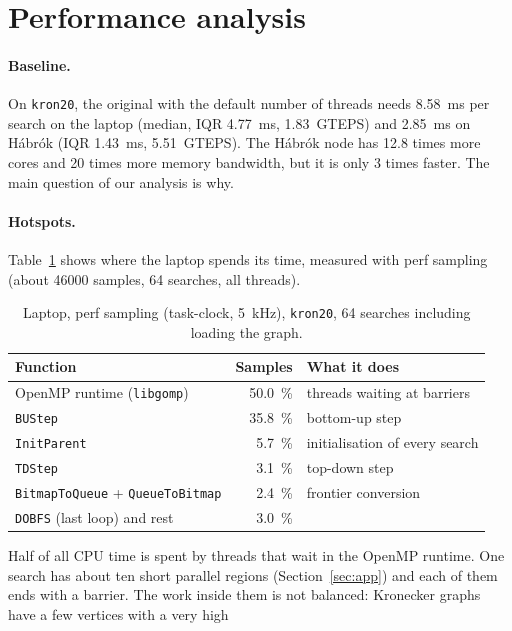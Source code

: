 \section{Performance analysis}
\label{sec:analysis}

\paragraph{Baseline.} On \texttt{kron20}, the original \gapbs{} with the default number of
threads needs \SI{8.58}{ms} per search on the laptop (median, IQR \SI{4.77}{ms},
\SI{1.83}{GTEPS}) and \SI{2.85}{ms} on Hábrók (IQR \SI{1.43}{ms}, \SI{5.51}{GTEPS}). The Hábrók
node has 12.8 times more cores and 20 times more memory bandwidth, but it is only 3 times
faster. The main question of our analysis is why.

\paragraph{Hotspots.} Table~\ref{tab:hotspots} shows where the laptop spends its time,
measured with perf sampling (about \num{46000} samples, 64 searches, all threads).
\begin{table}[ht]
\centering\small
\caption{Laptop, perf sampling (task-clock, \SI{5}{kHz}), \texttt{kron20}, 64 searches including loading the graph.}
\label{tab:hotspots}
\begin{tabular}{@{}lrl@{}}
\toprule
Function & Samples & What it does \\
\midrule
OpenMP runtime (\texttt{libgomp}) & \SI{50.0}{\percent} & threads waiting at barriers \\
\texttt{BUStep} & \SI{35.8}{\percent} & bottom-up step \\
\texttt{InitParent} & \SI{5.7}{\percent} & initialisation of every search \\
\texttt{TDStep} & \SI{3.1}{\percent} & top-down step \\
\texttt{BitmapToQueue} + \texttt{QueueToBitmap} & \SI{2.4}{\percent} & frontier conversion \\
\texttt{DOBFS} (last loop) and rest & \SI{3.0}{\percent} & \\
\bottomrule
\end{tabular}
\end{table}
Half of all CPU time is spent by threads that wait in the OpenMP runtime. One search has
about ten short parallel regions (Section~\ref{sec:app}) and each of them ends with a barrier.
The work inside them is not balanced: Kronecker graphs have a few vertices with a very high
